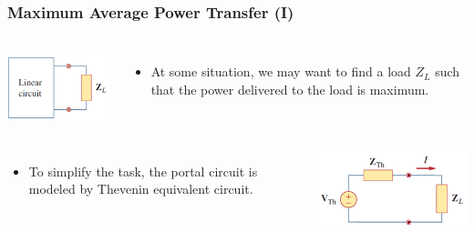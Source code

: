 \documentclass{beamer}
\begin{document}
\begin{frame}[fragile]
\frametitle{Maximum Average Power Transfer (I)}

\begin{columns}[c]

\includegraphics[width=\textwidth]{src/Max1.png}

\begin{itemize}
\item At some situation, we may want to find a load $Z_L$ such that the power delivered to the load is maximum.
\end{itemize}

\end{columns}

\begin{columns}[c]

\begin{itemize}
\item To simplify the task, the portal circuit is modeled by Thevenin equivalent circuit.
\end{itemize}

\includegraphics[width=\textwidth]{src/Max2.png}


\end{columns}
\end{frame}
\end{document}
